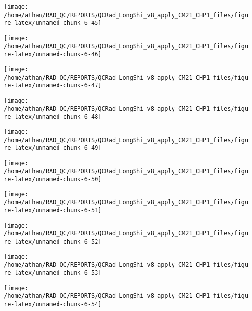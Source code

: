 \documentclass[
  10pt,
  a4paper,oneside]{article}
\begin{document}
\begin{center}\texttt{[image: /home/athan/RAD\_QC/REPORTS/QCRad\_LongShi\_v8\_apply\_CM21\_CHP1\_files/figure-latex/unnamed-chunk-6-45]} \end{center}

\begin{center}\texttt{[image: /home/athan/RAD\_QC/REPORTS/QCRad\_LongShi\_v8\_apply\_CM21\_CHP1\_files/figure-latex/unnamed-chunk-6-46]} \end{center}

\begin{center}\texttt{[image: /home/athan/RAD\_QC/REPORTS/QCRad\_LongShi\_v8\_apply\_CM21\_CHP1\_files/figure-latex/unnamed-chunk-6-47]} \end{center}

\begin{center}\texttt{[image: /home/athan/RAD\_QC/REPORTS/QCRad\_LongShi\_v8\_apply\_CM21\_CHP1\_files/figure-latex/unnamed-chunk-6-48]} \end{center}

\begin{center}\texttt{[image: /home/athan/RAD\_QC/REPORTS/QCRad\_LongShi\_v8\_apply\_CM21\_CHP1\_files/figure-latex/unnamed-chunk-6-49]} \end{center}

\begin{center}\texttt{[image: /home/athan/RAD\_QC/REPORTS/QCRad\_LongShi\_v8\_apply\_CM21\_CHP1\_files/figure-latex/unnamed-chunk-6-50]} \end{center}

\begin{center}\texttt{[image: /home/athan/RAD\_QC/REPORTS/QCRad\_LongShi\_v8\_apply\_CM21\_CHP1\_files/figure-latex/unnamed-chunk-6-51]} \end{center}

\begin{center}\texttt{[image: /home/athan/RAD\_QC/REPORTS/QCRad\_LongShi\_v8\_apply\_CM21\_CHP1\_files/figure-latex/unnamed-chunk-6-52]} \end{center}

\begin{center}\texttt{[image: /home/athan/RAD\_QC/REPORTS/QCRad\_LongShi\_v8\_apply\_CM21\_CHP1\_files/figure-latex/unnamed-chunk-6-53]} \end{center}

\begin{center}\texttt{[image: /home/athan/RAD\_QC/REPORTS/QCRad\_LongShi\_v8\_apply\_CM21\_CHP1\_files/figure-latex/unnamed-chunk-6-54]} \end{center}
\end{document}
